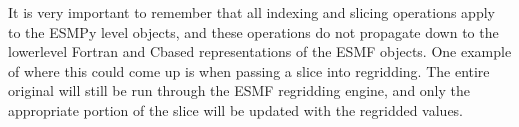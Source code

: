 \documentclass[letterpaper,10pt,english]{sphinxmanual}
\begin{document}
It is very important to remember that all indexing
and slicing operations apply  to the ESMPy level objects, and these operations
do not propagate down to the lower\sphinxhyphen{}level Fortran\sphinxhyphen{} and C\sphinxhyphen{}based representations
of the ESMF objects.  One example of where this could come up is when passing
a {\hyperref[\detokenize{field:ESMF.api.field.Field}]{}} slice into regridding.  The entire original {\hyperref[\detokenize{field:ESMF.api.field.Field}]{}} will still be run
through the ESMF regridding engine, and only the appropriate portion of
the {\hyperref[\detokenize{field:ESMF.api.field.Field}]{}} slice will be updated with the regridded values.
\end{document}
